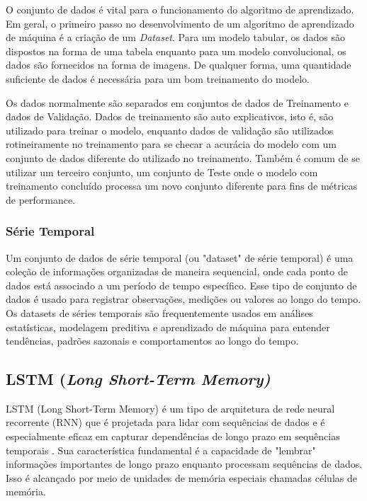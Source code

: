 O conjunto de dados é vital para o funcionamento do algoritmo de aprendizado. Em geral, o primeiro passo no desenvolvimento de um algoritmo de aprendizado de máquina é a criação de um \textit{Dataset}. Para um modelo tabular, os dados são dispostos na forma de uma tabela enquanto para um modelo convolucional, os dados são fornecidos na forma de imagens. De qualquer forma, uma quantidade suficiente de dados é necessária para um bom treinamento do modelo.

Os dados normalmente são separados em conjuntos de dados de Treinamento e dados de Validação. Dados de treinamento são auto explicativos, isto é, são utilizado para treinar o modelo, enquanto dados de validação são utilizados rotineiramente no treinamento para se checar a acurácia do modelo com um conjunto de dados diferente do utilizado no treinamento. Também é comum de se utilizar um terceiro conjunto, um conjunto de Teste onde o modelo com treinamento concluído processa um novo conjunto diferente para fins de métricas de performance.


\subsubsection{\textbf{Série Temporal}}
Um conjunto de dados de série temporal (ou "dataset" de série temporal) é uma coleção de informações organizadas de maneira sequencial, onde cada ponto de dados está associado a um período de tempo específico. Esse tipo de conjunto de dados é usado para registrar observações, medições ou valores ao longo do tempo. 
Os datasets de séries temporais são frequentemente usados em análises estatísticas, modelagem preditiva e aprendizado de máquina para entender tendências, padrões sazonais e comportamentos ao longo do tempo.


\subsection{\textbf{LSTM (\textit{Long Short-Term Memory) }}}

LSTM (Long Short-Term Memory) é um tipo de arquitetura de rede neural recorrente (RNN) que é projetada para lidar com sequências de dados e é especialmente eficaz em capturar dependências de longo prazo em sequências temporais \cite{lstm-}. Sua característica fundamental é a capacidade de "lembrar" informações importantes de longo prazo enquanto processam sequências de dados. Isso é alcançado por meio de unidades de memória especiais chamadas células de memória.

